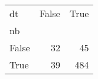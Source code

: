 \begin{tabular}{lrr}
\toprule
dt &  False &  True  \\
nb    &        &        \\
\midrule
False &     32 &     45 \\
True  &     39 &    484 \\
\bottomrule
\end{tabular}

